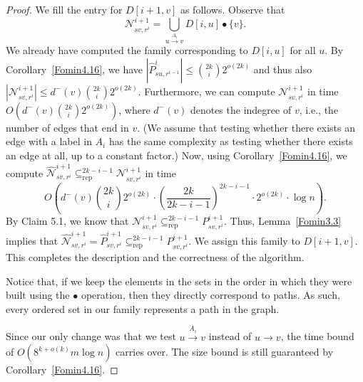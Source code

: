 \documentclass[a4paper,english]{lipics-v2016}
\theoremstyle{plain}
\begin{document}
\begin{proof}
We fill the entry for $D[i+1, v]$ as follows. Observe that 
$$\mathcal{N}^{i+1}_{sv,r^i}=\bigcup_{u\stackrel{A_i}{\to} v} D[i,u] \bullet \{v\}.$$
We already have computed the family corresponding to $D[i, u]$ for all $u$. By Corollary~\ref{Fomin4.16}, we have
$|\hat{P}^i_{su,r^{i-1}}| \leq \binom{2k}{i} 2^{o(2k)}$ and thus also
$|\mathcal{N}^{i+1}_{sv,r^i}| \leq d^-(v)\binom{2k}{i}2^{o(2k)}$.
Furthermore, we can compute $\mathcal{N}^{i+1}_{sv,r^i}$ in time
$O\left(d^-(v)\binom{2k}{i}2^{o(2k)} \right)$, where $d^-(v)$ denotes
the indegree of $v$, i.e., the number of edges that end in $v$. (We assume that testing whether there
exists an edge with a label in $A_i$ has the same complexity as
testing whether there exists an edge at all, up to a constant factor.) Now, using Corollary~\ref{Fomin4.16}, we compute $\hat{\mathcal{N}}^{i+1}_{sv,r^i} \subseteq^{2k-i-1}_\text{rep} \mathcal{N}^{i+1}_{sv,r^i}$ in time $$O\left( d^-(v)\binom{2k}{i} 2^{o(2k)}  \cdot \left(\dfrac{2k}{2k-i-1} \right)^{2k-i-1} \cdot 2^{o(2k)} \cdot \log n \right).$$ By Claim 5.1, we know that
$\mathcal{N}^{i+1}_{sv,r^i} \subseteq^{2k-i-1}_\text{rep} P^{i+1}_{sv,r^i}$. Thus, Lemma~\ref{Fomin3.3} implies that $\hat{\mathcal{N}}^{i+1}_{sv,r^i} = \hat{P}^{i+1}_{sv,r^i} \subseteq^{2k-i-1}_\text{rep} P^{i+1}_{sv,r^i}$. We assign this family to $D[i+1,v]$. This completes the description and the correctness of the algorithm. 

Notice that, if we keep the elements in the sets in the
order in which they were built using the $\bullet$ operation, then
they directly correspond to paths. As such, every ordered set in our family represents a path in the graph.


Since our only change was that we test $u\stackrel{A_i}{\to} v$ instead of $u\to v$, the
time bound of $O\left( 8^{k+o(k)}m \log n \right)$ \cite[Lemma 5.2]{fomin} carries over. The size bound is still guaranteed by Corollary~\ref{Fomin4.16}.\end{proof} 



\dichotomyThm*
\end{document}
